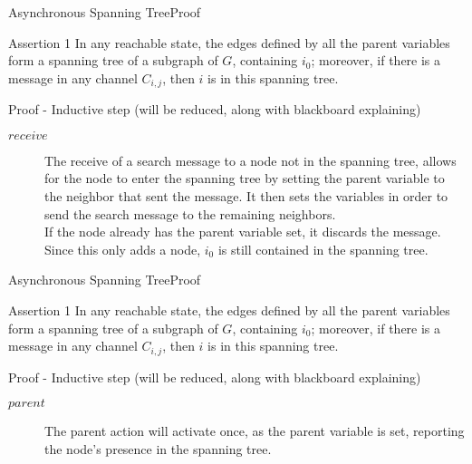 \documentclass[pdf]{beamer}
\begin{document}
\begin{frame}[plain]{Asynchronous Spanning Tree}{Proof}
    \begin{block}{Assertion 1}
    In any reachable state, the edges defined by all the parent variables form a spanning tree
    of a subgraph of $G$, containing $i_0$; moreover, if there is a message in any channel $C_{i,j}$,
    then $i$ is in this spanning tree.
    \end{block}	
    \begin{block}{Proof - Inductive step (will be reduced, along with blackboard explaining)}
    \begin{description}
    \item[$receive$]{\small The receive of a search message to a node not in the spanning tree, allows for the node to enter the spanning tree by setting the parent variable to the neighbor that sent the message. It then sets the variables in order to send the search message to the remaining neighbors.\\
        If the node already has the parent variable set, it discards the message. 
    Since this only adds a node, $i_0$ is still contained in the spanning tree.}
    \end{description}
    \end{block}
\end{frame}

\begin{frame}[plain]{Asynchronous Spanning Tree}{Proof}
    \begin{block}{Assertion 1}
    In any reachable state, the edges defined by all the parent variables form a spanning tree
    of a subgraph of $G$, containing $i_0$; moreover, if there is a message in any channel $C_{i,j}$,
    then $i$ is in this spanning tree.
    \end{block}	
    \begin{block}{Proof - Inductive step (will be reduced, along with blackboard explaining)}
    \begin{description}
    \item[$parent$]{The parent action will activate once, as the parent variable is set, reporting the node's presence in the spanning tree.}
    \end{description}
    \end{block}
\end{frame}
\end{document}
